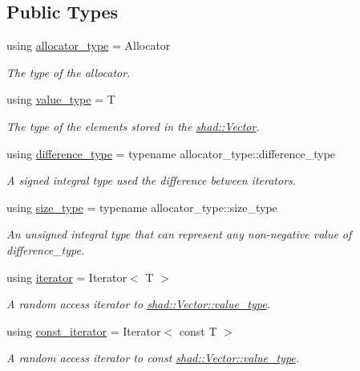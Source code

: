 \subsection*{Public Types}
\begin{DoxyCompactItemize}
\item 
using \hyperlink{classshad_1_1Vector_ad950d846edeeed7cc4a9163f9f679624}{allocator\-\_\-type} = Allocator
\begin{DoxyCompactList}\small\item\em The type of the allocator. \end{DoxyCompactList}\item 
using \hyperlink{classshad_1_1Vector_adb97b89826617473f44b4bb1dd3308ba}{value\-\_\-type} = T
\begin{DoxyCompactList}\small\item\em The type of the elements stored in the \hyperlink{classshad_1_1Vector}{shad\-::\-Vector}. \end{DoxyCompactList}\item 
using \hyperlink{classshad_1_1Vector_a46e5348988a063d58ed55c76fc94cec1}{difference\-\_\-type} = typename allocator\-\_\-type\-::difference\-\_\-type
\begin{DoxyCompactList}\small\item\em A signed integral type used the difference between iterators. \end{DoxyCompactList}\item 
using \hyperlink{classshad_1_1Vector_a1c97f4eb87d738cb4de97e5b3587c397}{size\-\_\-type} = typename allocator\-\_\-type\-::size\-\_\-type
\begin{DoxyCompactList}\small\item\em An unsigned integral type that can represent any non-\/negative value of difference\-\_\-type. \end{DoxyCompactList}\item 
using \hyperlink{classshad_1_1Vector_aaa71fd41daa1548f8436bc54ef507976}{iterator} = Iterator$<$ T $>$
\begin{DoxyCompactList}\small\item\em A random access iterator to \hyperlink{classshad_1_1Vector_adb97b89826617473f44b4bb1dd3308ba}{shad\-::\-Vector\-::value\-\_\-type}. \end{DoxyCompactList}\item 
using \hyperlink{classshad_1_1Vector_ab677e6f62431a450c856e7ffe44efbc6}{const\-\_\-iterator} = Iterator$<$ const T $>$
\begin{DoxyCompactList}\small\item\em A random access iterator to const \hyperlink{classshad_1_1Vector_adb97b89826617473f44b4bb1dd3308ba}{shad\-::\-Vector\-::value\-\_\-type}. \end{DoxyCompactList}\item 

\end{DoxyCompactItemize}
